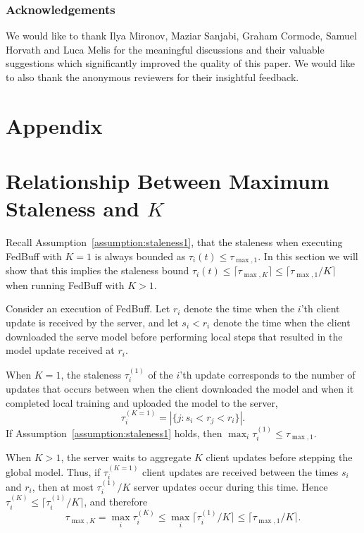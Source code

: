 \documentclass[twoside]{article}
\newcommand{\algname}{{FedBuff}\xspace}
\begin{document}
\subsubsection*{Acknowledgements}
We would like to thank Ilya Mironov, Maziar Sanjabi, Graham Cormode, Samuel Horvath and Luca Melis for the meaningful discussions and their valuable suggestions which significantly improved the quality of this paper. We would like to also thank the anonymous reviewers for their insightful feedback. 




\clearpage
\onecolumn
\appendix
\section*{Appendix}
\section{Relationship Between Maximum Staleness and $K$}
\label{appendix:staleness-K}

Recall Assumption~\ref{assumption:staleness1}, that the staleness when executing \algname with $K=1$ is always bounded as $\tau_i(t) \le \tau_{\max, 1}$. In this section we will show that this implies the staleness bound $\tau_i(t) \le \lceil \tau_{\max, K} \rceil \le \lceil \tau_{\max, 1}/K \rceil$ when running \algname with $K > 1$.

Consider an execution of \algname. Let $r_i$ denote the time when the $i$'th client update is received by the server, and let $s_i < r_i$ denote the time when the client downloaded the serve model before performing local steps that resulted in the model update received at $r_i$.

When $K=1$, the staleness $\tau_i^{(1)}$ of the $i$'th update corresponds to the number of updates that occurs between when the client downloaded the model and when it completed local training and uploaded the model to the server,
\[
\tau_i^{(K=1)} = |\{j \colon s_i < r_j < r_i \}|.
\]
If Assumption~\ref{assumption:staleness1} holds, then $\max_{i} \tau_i^{(1)} \le \tau_{\max,1}.$

When $K > 1$, the server waits to aggregate $K$ client updates before stepping the global model. Thus, if $\tau_i^{(K=1)}$ client updates are received between the times $s_i$ and $r_i$, then at most $\tau_i^{(1)} / K$ server updates occur during this time. Hence $\tau_i^{(K)} \le \lceil \tau_i^{(1)} / K \rceil$, and therefore
\[
\tau_{\max, K} = \max_i \tau_i^{(K)} \le \max_i \lceil \tau_i^{(1)} / K \rceil \le \lceil \tau_{\max, 1} / K \rceil.
\]
\end{document}
